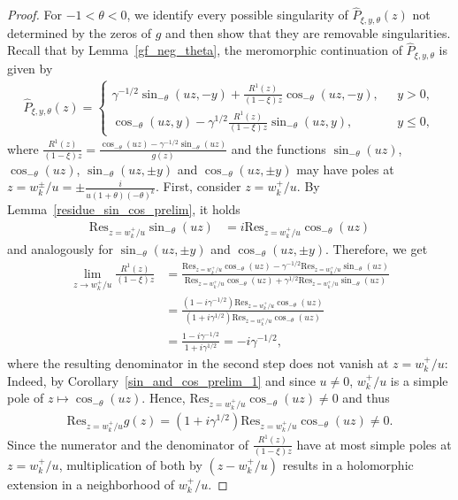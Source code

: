 \documentclass[12pt]{article}
\newcommand{\1}{\mathds{1}}
\theoremstyle{definition}
\theoremstyle{plain}
\theoremstyle{remark}
\begin{document}
\begin{proof}
For $-1<\theta<0$, we identify every possible singularity of $\hat{P}_{\xi,y,\theta}(z)$ not determined by the zeros of $g$ and then show that they are removable singularities. Recall that by Lemma~\ref{gf_neg_theta}, the meromorphic continuation of $\hat{P}_{\xi,y,\theta}$ is given by
\begin{align*}
      \hat{P}_{\xi,y,\theta}(z)=  
      \begin{cases}
          \gamma^{-1/2}\sin_{-\theta}(uz,-y)+\frac{R^1(z)}{(1-\xi) z}\cos_{-\theta}(uz,-y),~~~&y>0,
          \\\cos_{-\theta}(uz,y)
     -\gamma^{1/2}\frac{R^1(z)}{(1-\xi) z}\sin_{-\theta}(uz,y),&y\le 0,
      \end{cases}
    \end{align*}
    where $\frac{R^1(z)}{(1-\xi) z}=\frac{\cos_{-\theta}(uz)-\gamma^{-1/2}\sin_{-\theta}(uz)}{g(z)}$
and the functions $\sin_{-\theta}(uz)$, $\cos_{-\theta}(uz)$, $\sin_{-\theta}(uz,\pm y)$ and $\cos_{-\theta}(uz,\pm y)$ may have poles at $z=w_k^\pm/u=\pm\frac{i}{u(1+\theta)(-\theta)^k}$. First, consider $z=w_k^+/u$. By Lemma~\ref{residue_sin_cos_prelim}, it holds
\begin{align*}
    \mathrm{Res}_{z=w_k^+/u}\sin_{-\theta}(uz)&= i\mathrm{Res}_{z=w_k^+/u}\cos_{-\theta}(uz)
\end{align*}
and analogously for $\sin_{-\theta}(uz,\pm y)$ and $\cos_{-\theta}(uz,\pm y)$. Therefore, we get
\begin{align*}
    \lim_{z\to w_k^+/u}\frac{R^1(z)}{(1-\xi) z}
    &=\frac{\mathrm{Res}_{z=w_k^+/u}\cos_{-\theta}(uz)-\gamma^{-1/2}\mathrm{Res}_{z=w_k^+/u}\sin_{-\theta}(uz)}{\mathrm{Res}_{z=w_k^+/u}\cos_{-\theta}(uz)+\gamma^{1/2}\mathrm{Res}_{z=w_k^+/u}\sin_{-\theta}(uz)}
    \\&=\frac{(1-i\gamma^{-1/2})\mathrm{Res}_{z=w_k^+/u}\cos_{-\theta}(uz)}{(1+i\gamma^{1/2})\mathrm{Res}_{z=w_k^+/u}\cos_{-\theta}(uz)}
    \\&=\frac{1-i\gamma^{-1/2}}{1+i\gamma^{1/2}}=-i\gamma^{-1/2},
\end{align*}
where the resulting denominator in the second step does not vanish at $z= w_k^+/u$: Indeed, by Corollary~\ref{sin_and_cos_prelim_1} and since $u\neq0$,
$w_k^+/u$ is a simple pole of
$z\mapsto\cos_{-\theta}(uz)$. Hence, $\mathrm{Res}_{z=w_k^+/u}\cos_{-\theta}(uz)\neq0$ and thus
\begin{align*}
     \mathrm{Res}_{z=w_k^+/u}g(z)=(1+i\gamma^{1/2} )\mathrm{Res}_{z=w_k^+/u}\cos_{-\theta}(uz)\ne 0.
\end{align*}
Since the numerator and the denominator of $\frac{R^1(z)}{(1-\xi) z}$ have at most simple poles at $z= w_k^+/u$, multiplication of both by $(z- w_k^+/u)$ results in a holomorphic extension in a neighborhood of $w_k^+/u$. 

\end{proof}
\end{document}
